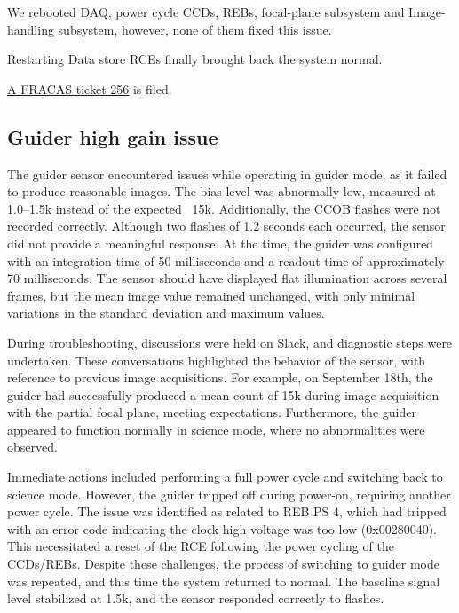 We rebooted DAQ, power cycle CCDs, REBs, focal-plane subsystem and Image-handling subsystem, however, none of them fixed this issue. 

Restarting Data store RCEs finally brought back the system normal. 

\href{https://rubinobs.atlassian.net/browse/FRACAS-256}{A FRACAS ticket 256} is filed. 

\clearpage
\subsection{Guider high gain issue}

The guider sensor encountered issues while operating in guider mode, as it failed to produce reasonable images. The bias level was abnormally low, measured at 1.0–1.5k instead of the expected ~15k. Additionally, the CCOB flashes were not recorded correctly. Although two flashes of 1.2 seconds each occurred, the sensor did not provide a meaningful response. At the time, the guider was configured with an integration time of 50 milliseconds and a readout time of approximately 70 milliseconds. The sensor should have displayed flat illumination across several frames, but the mean image value remained unchanged, with only minimal variations in the standard deviation and maximum values.

During troubleshooting, discussions were held on Slack, and diagnostic steps were undertaken. These conversations highlighted the behavior of the sensor, with reference to previous image acquisitions. For example, on September 18th, the guider had successfully produced a mean count of 15k during image acquisition with the partial focal plane, meeting expectations. Furthermore, the guider appeared to function normally in science mode, where no abnormalities were observed.

Immediate actions included performing a full power cycle and switching back to science mode. However, the guider tripped off during power-on, requiring another power cycle. The issue was identified as related to REB PS 4, which had tripped with an error code indicating the clock high voltage was too low (0x00280040). This necessitated a reset of the RCE following the power cycling of the CCDs/REBs. Despite these challenges, the process of switching to guider mode was repeated, and this time the system returned to normal. The baseline signal level stabilized at 1.5k, and the sensor responded correctly to flashes.

